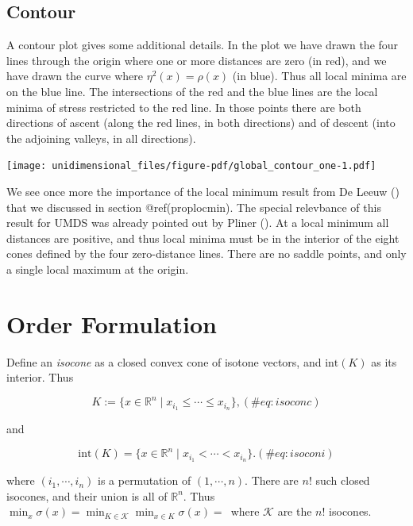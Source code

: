 \documentclass[
  12pt,
  letterpaper,
  DIV=11,
  numbers=noendperiod]{scrreprt}
\theoremstyle{remark}
\begin{document}
\subsection{Contour}\label{contour}

A contour plot gives some additional details. In the plot we have drawn
the four lines through the origin where one or more distances are zero
(in red), and we have drawn the curve where \(\eta^2(x)=\rho(x)\) (in
blue). Thus all local minima are on the blue line. The intersections of
the red and the blue lines are the local minima of stress restricted to
the red line. In those points there are both directions of ascent (along
the red lines, in both directions) and of descent (into the adjoining
valleys, in all directions).

\begin{center}
\texttt{[image: unidimensional\_files/figure-pdf/global\_contour\_one-1.pdf]}
\end{center}

We see once more the importance of the local minimum result from De
Leeuw () that we discussed in section
@ref(proplocmin). The special relevbance of this result for UMDS was
already pointed out by Pliner (). At a
local minimum all distances are positive, and thus local minima must be
in the interior of the eight cones defined by the four zero-distance
lines. There are no saddle points, and only a single local maximum at
the origin.

\section{Order Formulation}\label{order-formulation}

Define an \emph{isocone} as a closed convex cone of isotone vectors, and
\(\text{int}(K)\) as its interior. Thus

\begin{equation}
K:=\{x\in\mathbb{R}^n\mid x_{i_1}\leq\cdots\leq x_{i_n}\},
(\#eq:isoconc)
\end{equation}

and

\begin{equation}
\text{int}(K)=\{x\in\mathbb{R}^n\mid x_{i_1}<\cdots< x_{i_n}\}.
(\#eq:isoconi)
\end{equation}

where \((i_1,\cdots,i_n)\) is a permutation of \((1,\cdots,n)\). There
are \(n!\) such closed isocones, and their union is all of
\(\mathbb{R}^n\). Thus
\(\min_x\sigma(x)=\min_{K\in\mathcal{K}}\min_{x\in K}\sigma(x)=\,\)
where \(\mathcal{K}\) are the \(n!\) isocones.
\end{document}
